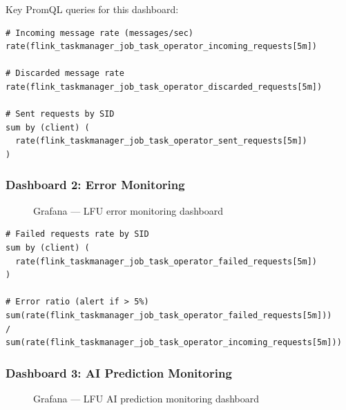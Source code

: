Key PromQL queries for this dashboard:

\begin{lstlisting}[caption={PromQL queries for pipeline overview}]
# Incoming message rate (messages/sec)
rate(flink_taskmanager_job_task_operator_incoming_requests[5m])

# Discarded message rate
rate(flink_taskmanager_job_task_operator_discarded_requests[5m])

# Sent requests by SID
sum by (client) (
  rate(flink_taskmanager_job_task_operator_sent_requests[5m])
)
\end{lstlisting}

\subsubsection{Dashboard 2: Error Monitoring}

\begin{figure}[H]
    \centering
    \caption{Grafana --- LFU error monitoring dashboard}
    \label{fig:grafana-errors}
\end{figure}

\begin{lstlisting}[caption={PromQL queries for error monitoring}]
# Failed requests rate by SID
sum by (client) (
  rate(flink_taskmanager_job_task_operator_failed_requests[5m])
)

# Error ratio (alert if > 5%)
sum(rate(flink_taskmanager_job_task_operator_failed_requests[5m]))
/
sum(rate(flink_taskmanager_job_task_operator_incoming_requests[5m]))
\end{lstlisting}

\subsubsection{Dashboard 3: AI Prediction Monitoring}

\begin{figure}[H]
    \centering
    \caption{Grafana --- LFU AI prediction monitoring dashboard}
    \label{fig:grafana-ai}
\end{figure}

